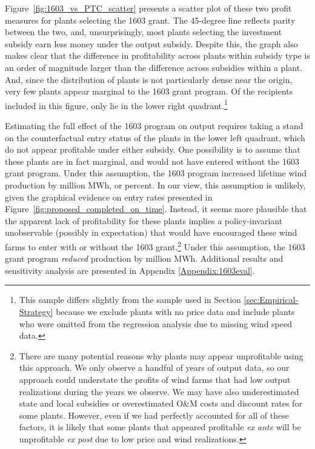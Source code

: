 \documentclass[12pt]{article}
\begin{document}
Figure~\ref{fig:1603_vs_PTC_scatter} presents a scatter plot of these two profit measures for plants selecting the 1603 grant. The 45-degree line reflects parity between the two, and, unsurprisingly, most plants selecting the investment subsidy earn less money under the output subsidy. Despite this, the graph also makes clear that the difference in profitability across plants within subsidy type is an order of magnitude larger than the difference across subsidies within a plant. And, since the distribution of plants is not particularly dense near the origin, very few plants appear marginal to the 1603 grant program. Of the   recipients included in this figure, only  \unskip lie in the lower right quadrant.\footnote{This sample differs slightly from the sample used in Section \ref{sec:Empirical-Strategy} because we exclude plants with no price data and include plants who were omitted from the regression analysis due to missing wind speed data.} 

Estimating the full effect of the 1603 program on output requires taking a stand on the counterfactual entry status of the  \unskip plants in the lower left quadrant, which do not appear profitable under either subsidy. One possibility is to assume that these plants are in fact marginal, and would not have entered without the 1603 grant program. Under this assumption, the 1603 program increased lifetime wind production by  \unskip million MWh, or  \unskip percent. In our view, this assumption is unlikely, given the graphical evidence on entry rates presented in Figure~\ref{fig:proposed_completed_on_time}. Instead, it seems more plausible that the apparent lack of profitability for these plants implies a policy-invariant unobservable (possibly in expectation) that would have encouraged these wind farms to enter with or without the 1603 grant.\footnote{There are many potential reasons why plants may appear unprofitable using this approach. We only observe a handful of years of output data, so our approach could understate the profits of wind farms that had low output realizations during the years we observe. We may have also underestimated state and local subsidies or overestimated O\&M costs and discount rates for some plants. However, even if we had perfectly accounted for all of these factors, it is likely that some plants that appeared profitable \emph{ex ante} will be unprofitable \emph{ex post} due to low price and wind realizations.} Under this assumption, the 1603 grant program \textit{reduced} production by million MWh. Additional results and sensitivity analysis are presented in Appendix \ref{Appendix:1603eval}.
\end{document}
